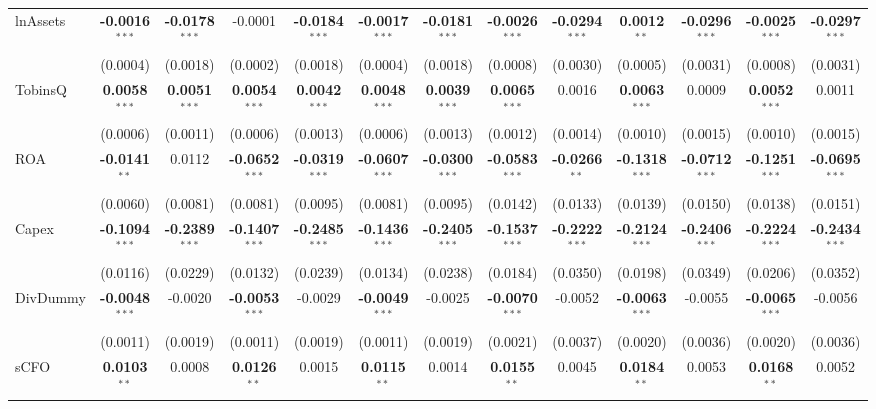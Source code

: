 \documentclass[11pt,a4paper]{article}
\begin{document}
\begin{table}[htbp]
\begin{tabular}{lcccccccccccc}
lnAssets & \textbf{-0.0016}$^{***}$ & \textbf{-0.0178}$^{***}$ & -0.0001 & \textbf{-0.0184}$^{***}$ & \textbf{-0.0017}$^{***}$ & \textbf{-0.0181}$^{***}$ & \textbf{-0.0026}$^{***}$ & \textbf{-0.0294}$^{***}$ & \textbf{0.0012}$^{**}$ & \textbf{-0.0296}$^{***}$ & \textbf{-0.0025}$^{***}$ & \textbf{-0.0297}$^{***}$ \\
 & (0.0004) & (0.0018) & (0.0002) & (0.0018) & (0.0004) & (0.0018) & (0.0008) & (0.0030) & (0.0005) & (0.0031) & (0.0008) & (0.0031) \\
TobinsQ & \textbf{0.0058}$^{***}$ & \textbf{0.0051}$^{***}$ & \textbf{0.0054}$^{***}$ & \textbf{0.0042}$^{***}$ & \textbf{0.0048}$^{***}$ & \textbf{0.0039}$^{***}$ & \textbf{0.0065}$^{***}$ & 0.0016 & \textbf{0.0063}$^{***}$ & 0.0009 & \textbf{0.0052}$^{***}$ & 0.0011 \\
 & (0.0006) & (0.0011) & (0.0006) & (0.0013) & (0.0006) & (0.0013) & (0.0012) & (0.0014) & (0.0010) & (0.0015) & (0.0010) & (0.0015) \\
ROA & \textbf{-0.0141}$^{**}$ & 0.0112 & \textbf{-0.0652}$^{***}$ & \textbf{-0.0319}$^{***}$ & \textbf{-0.0607}$^{***}$ & \textbf{-0.0300}$^{***}$ & \textbf{-0.0583}$^{***}$ & \textbf{-0.0266}$^{**}$ & \textbf{-0.1318}$^{***}$ & \textbf{-0.0712}$^{***}$ & \textbf{-0.1251}$^{***}$ & \textbf{-0.0695}$^{***}$ \\
 & (0.0060) & (0.0081) & (0.0081) & (0.0095) & (0.0081) & (0.0095) & (0.0142) & (0.0133) & (0.0139) & (0.0150) & (0.0138) & (0.0151) \\
Capex & \textbf{-0.1094}$^{***}$ & \textbf{-0.2389}$^{***}$ & \textbf{-0.1407}$^{***}$ & \textbf{-0.2485}$^{***}$ & \textbf{-0.1436}$^{***}$ & \textbf{-0.2405}$^{***}$ & \textbf{-0.1537}$^{***}$ & \textbf{-0.2222}$^{***}$ & \textbf{-0.2124}$^{***}$ & \textbf{-0.2406}$^{***}$ & \textbf{-0.2224}$^{***}$ & \textbf{-0.2434}$^{***}$ \\
 & (0.0116) & (0.0229) & (0.0132) & (0.0239) & (0.0134) & (0.0238) & (0.0184) & (0.0350) & (0.0198) & (0.0349) & (0.0206) & (0.0352) \\
DivDummy & \textbf{-0.0048}$^{***}$ & -0.0020 & \textbf{-0.0053}$^{***}$ & -0.0029 & \textbf{-0.0049}$^{***}$ & -0.0025 & \textbf{-0.0070}$^{***}$ & -0.0052 & \textbf{-0.0063}$^{***}$ & -0.0055 & \textbf{-0.0065}$^{***}$ & -0.0056 \\
 & (0.0011) & (0.0019) & (0.0011) & (0.0019) & (0.0011) & (0.0019) & (0.0021) & (0.0037) & (0.0020) & (0.0036) & (0.0020) & (0.0036) \\
sCFO & \textbf{0.0103}$^{**}$ & 0.0008 & \textbf{0.0126}$^{**}$ & 0.0015 & \textbf{0.0115}$^{**}$ & 0.0014 & \textbf{0.0155}$^{**}$ & 0.0045 & \textbf{0.0184}$^{**}$ & 0.0053 & \textbf{0.0168}$^{**}$ & 0.0052 \\

\end{tabular}
\end{table}
\end{document}
